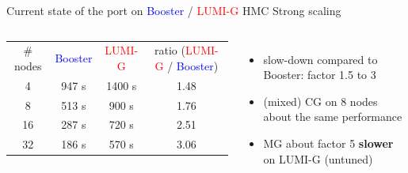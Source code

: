 \documentclass[xcolor={dvipsnames,table}]{beamer}
\begin{document}
\begin{frame}{Current state of the port on \textcolor{blue}{Booster} / \textcolor{red}{LUMI-G} }{HMC Strong scaling}
\begin{columns}
      \centering
      \footnotesize
      \begin{tabular}{cccc}
        \# nodes & \textcolor{blue}{Booster} & \textcolor{red}{LUMI-G} & ratio (\textcolor{red}{LUMI-G} / \textcolor{blue}{Booster}) \\
        4        & 947 s & 1400 s & 1.48 \\
        8        & 513 s &  900 s & 1.76 \\
        16       & 287 s &  720 s & 2.51 \\
        32       & 186 s &  570 s & 3.06
      \end{tabular}
      \begin{itemize}
        \item slow-down compared to Booster: factor 1.5 to 3
        \item (mixed) CG on 8 nodes about the same performance
        \item MG about factor 5 \textbf{slower} on LUMI-G (untuned)
      \end{itemize}
  \end{columns}
\end{frame}
\end{document}
